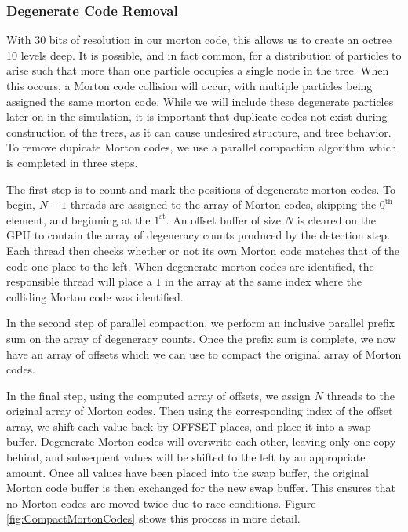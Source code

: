 \documentclass{thesis}
\begin{document}
\subsubsection{Degenerate Code Removal}
With 30 bits of resolution in our morton code, this allows us to create an octree 10 levels deep. It is possible, and in fact common, for a distribution of particles to arise such that more than one particle occupies a single node in the tree. When this occurs, a Morton code collision will occur, with multiple particles being assigned the same morton code. While we will include these degenerate particles later on in the simulation, it is important that duplicate codes not exist during construction of the trees, as it can cause undesired structure, and tree behavior. To remove dupicate Morton codes, we use a parallel compaction algorithm which is completed in three steps.

The first step is to count and mark the positions of degenerate morton codes. To begin, $N - 1$ threads are assigned to the array of Morton codes, skipping the $\text{0}^\text{th}$ element, and beginning at the $\text{1}^\text{st}$. An offset buffer of size $N$ is cleared on the GPU to contain the array of degeneracy counts produced by the detection step. Each thread then checks whether or not its own Morton code matches that of the code one place to the left. When degenerate morton codes are identified, the responsible thread will place a $1$ in the array at the same index where the colliding Morton code was identified.

In the second step of parallel compaction, we perform an inclusive parallel prefix sum on the array of degeneracy counts. Once the prefix sum is complete, we now have an array of offsets which we can use to compact the original array of Morton codes.

In the final step, using the computed array of offsets, we assign $N$ threads to the original array of Morton codes. Then using the corresponding index of the offset array, we shift each value back by OFFSET places, and place it into a swap buffer. Degenerate Morton codes will overwrite each other, leaving only one copy behind, and subsequent values will be shifted to the left by an appropriate amount. Once all values have been placed into the swap buffer, the original Morton code buffer is then exchanged for the new swap buffer. This ensures that no Morton codes are moved twice due to race conditions. Figure \ref{fig:CompactMortonCodes} shows this process in more detail.
\end{document}
